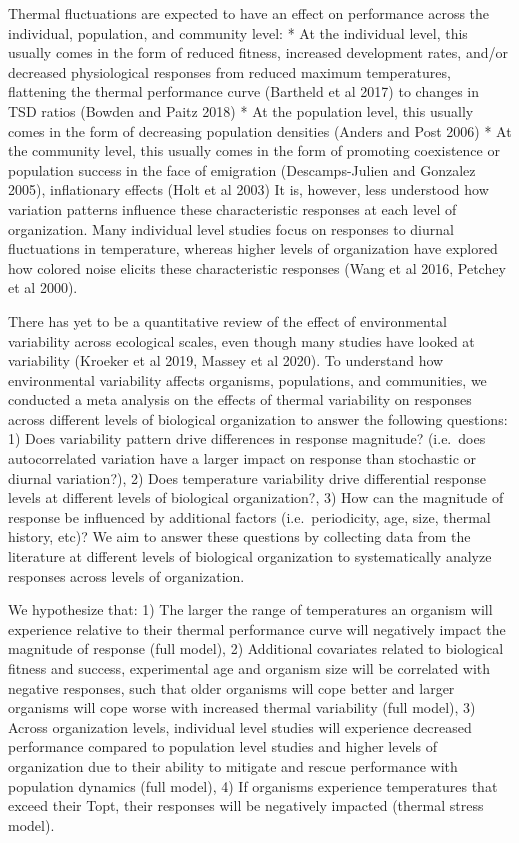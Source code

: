 \documentclass[12pt,twoside]{reedthesis}
\begin{document}
Thermal fluctuations are expected to have an effect on performance across the individual, population, and community level:
* At the individual level, this usually comes in the form of reduced fitness, increased development rates, and/or decreased physiological responses from reduced maximum temperatures, flattening the thermal performance curve (Bartheld et al 2017) to changes in TSD ratios (Bowden and Paitz 2018)
* At the population level, this usually comes in the form of decreasing population densities (Anders and Post 2006)
* At the community level, this usually comes in the form of promoting coexistence or population success in the face of emigration (Descamps-Julien and Gonzalez 2005), inflationary effects (Holt et al 2003)
It is, however, less understood how variation patterns influence these characteristic responses at each level of organization. Many individual level studies focus on responses to diurnal fluctuations in temperature, whereas higher levels of organization have explored how colored noise elicits these characteristic responses (Wang et al 2016, Petchey et al 2000).

There has yet to be a quantitative review of the effect of environmental variability across ecological scales, even though many studies have looked at variability (Kroeker et al 2019, Massey et al 2020). To understand how environmental variability affects organisms, populations, and communities, we conducted a meta analysis on the effects of thermal variability on responses across different levels of biological organization to answer the following questions:
1) Does variability pattern drive differences in response magnitude? (i.e.~does autocorrelated variation have a larger impact on response than stochastic or diurnal variation?), 2) Does temperature variability drive differential response levels at different levels of biological organization?, 3) How can the magnitude of response be influenced by additional factors (i.e.~periodicity, age, size, thermal history, etc)? We aim to answer these questions by collecting data from the literature at different levels of biological organization to systematically analyze responses across levels of organization.

We hypothesize that: 1) The larger the range of temperatures an organism will experience relative to their thermal performance curve will negatively impact the magnitude of response (full model), 2) Additional covariates related to biological fitness and success, experimental age and organism size will be correlated with negative responses, such that older organisms will cope better and larger organisms will cope worse with increased thermal variability (full model), 3) Across organization levels, individual level studies will experience decreased performance compared to population level studies and higher levels of organization due to their ability to mitigate and rescue performance with population dynamics (full model), 4) If organisms experience temperatures that exceed their Topt, their responses will be negatively impacted (thermal stress model).
\end{document}
